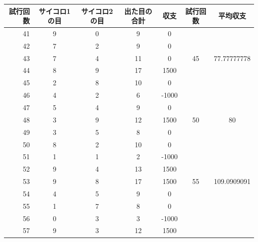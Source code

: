 \documentclass[12pt]{jarticle}
\begin{document}
\begin{table}
    \begin{tabular}[h]{|r|c|c|c|c|c|c|}
        \hline
        試行回数  & サイコロ1の目 & サイコロ2の目 & 出た目の合計 & 収支  & 試行回数 & 平均収支    \\ \hline
        41        & 9             & 0             & 9            & 0     &          &             \\
        42        & 7             & 2             & 9            & 0     &          &             \\
        43        & 7             & 4             & 11           & 0     & 45       & 77.77777778 \\
        44        & 8             & 9             & 17           & 1500  &          &             \\
        45        & 2             & 8             & 10           & 0     &          &             \\
        \hline 46 & 4             & 2             & 6            & -1000 &          &             \\
        47        & 5             & 4             & 9            & 0     &          &             \\
        48        & 3             & 9             & 12           & 1500  & 50       & 80          \\
        49        & 3             & 5             & 8            & 0     &          &             \\
        50        & 8             & 2             & 10           & 0     &          &             \\
        \hline 51 & 1             & 1             & 2            & -1000 &          &             \\
        52        & 9             & 4             & 13           & 1500  &          &             \\
        53        & 9             & 8             & 17           & 1500  & 55       & 109.0909091 \\
        54        & 4             & 5             & 9            & 0     &          &             \\
        55        & 1             & 7             & 8            & 0     &          &             \\
        \hline 56 & 0             & 3             & 3            & -1000 &          &             \\
        57        & 9             & 3             & 12           & 1500  &          &             \\

\end{tabular}
\end{table}
\end{document}
